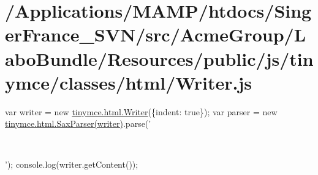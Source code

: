 \hypertarget{_2_applications_2_m_a_m_p_2htdocs_2_singer_france__s_v_n_2src_2_acme_group_2_labo_bundle_2_resou189f554233a0279bb7d50f7405c2cbb5}{\section{/\+Applications/\+M\+A\+M\+P/htdocs/\+Singer\+France\+\_\+\+S\+V\+N/src/\+Acme\+Group/\+Labo\+Bundle/\+Resources/public/js/tinymce/classes/html/\+Writer.\+js}
}
var writer = new \hyperlink{classtinymce_1_1html_1_1_writer}{tinymce.\+html.\+Writer}(\{indent\+: true\}); var parser = new \hyperlink{classtinymce_1_1html_1_1_sax_parser}{tinymce.\+html.\+Sax\+Parser(writer)}.parse('

~\newline


'); console.\+log(writer.\+get\+Content());


\begin{DoxyCodeInclude}
\end{DoxyCodeInclude}
 